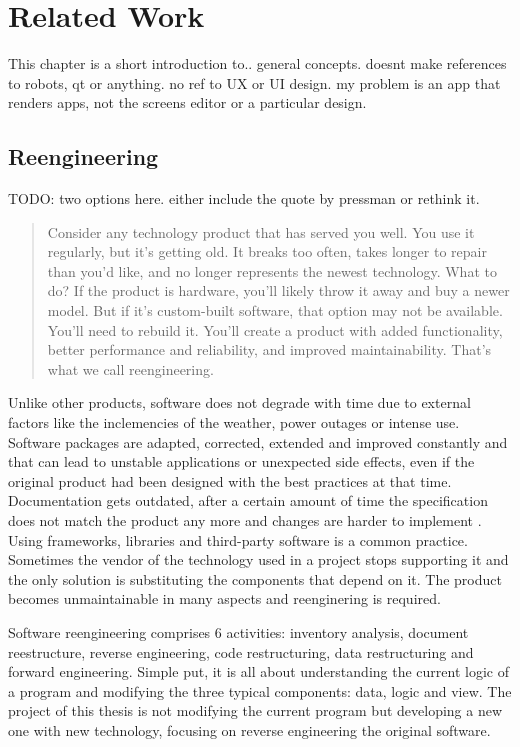 \chapter{Related Work}
This chapter is a short introduction to.. general concepts. doesnt make references to
robots, qt or anything. no ref to UX or UI design. my problem is an app that renders
apps, not the screens editor or a particular design.

\section{Reengineering}
\label{sec:reengineering}

TODO: two options here. either include the  quote by pressman or rethink it.
\begin{quote} 
Consider any technology product that has served you well. 
You use it regularly, but it's getting old. 
It breaks too often, takes longer to repair than you'd like, and no longer represents the newest technology.
What to do? If the product is hardware, you'll likely throw it away and buy a newer model.
But if it's custom-built software, that option may not be available. 
You'll need to rebuild it. 
You'll create a product with added functionality, better performance and reliability, and improved maintainability.
That's what we call reengineering. \cite{Pressman:2007}
\end{quote}

Unlike other products, software does not degrade with time due to external factors like the inclemencies of the weather, power outages or intense use.
Software packages are adapted, corrected, extended and improved constantly and that can lead to unstable applications or unexpected side effects, even if the original product had been designed with the best practices at that time.
Documentation gets outdated, after a certain amount of time the specification does not match the product any more and changes are harder to implement . %
Using frameworks, libraries and third-party software is a common practice. 
Sometimes the vendor of the technology used in a project stops supporting it and the only solution is substituting the components that depend on it. 
The product becomes unmaintainable in many aspects and reenginering is required. 

Software reengineering comprises 6 activities: inventory analysis, document reestructure, reverse engineering, code restructuring, data restructuring and forward engineering.
Simple put, it is all about understanding the current logic of a program and modifying the three typical components: data, logic and view.
The project of this thesis is not modifying the current program but developing a new one with new technology, focusing on reverse engineering the original software. 

